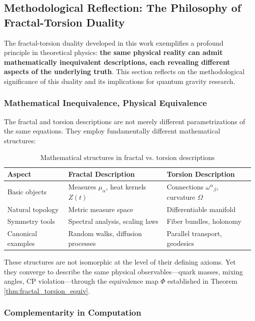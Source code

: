\subsection{Methodological Reflection: The Philosophy of Fractal-Torsion Duality}
\label{sec:methodology}

The fractal-torsion duality developed in this work exemplifies a profound principle in theoretical physics: \textbf{the same physical reality can admit mathematically inequivalent descriptions, each revealing different aspects of the underlying truth}. This section reflects on the methodological significance of this duality and its implications for quantum gravity research.

\subsubsection{Mathematical Inequivalence, Physical Equivalence}

The fractal and torsion descriptions are not merely different parametrizations of the same equations. They employ fundamentally different mathematical structures:

\begin{table}[h]
\centering
\begin{tabular}{p{3cm}p{4cm}p{4cm}}
\hline
\textbf{Aspect} & \textbf{Fractal Description} & \textbf{Torsion Description} \\
\hline
Basic objects & Measures $\mu_\alpha$, heat kernels $Z(t)$ & Connections $\omega^\alpha{}_\beta$, curvature $\Omega$ \\
Natural topology & Metric measure space & Differentiable manifold \\
Symmetry tools & Spectral analysis, scaling laws & Fiber bundles, holonomy \\
Canonical examples & Random walks, diffusion processes & Parallel transport, geodesics \\
\hline
\end{tabular}
\caption{Mathematical structures in fractal vs. torsion descriptions}
\end{table}

These structures are not isomorphic at the level of their defining axioms. Yet they converge to describe the same physical observables—quark masses, mixing angles, CP violation—through the equivalence map $\Phi$ established in Theorem \ref{thm:fractal_torsion_equiv}.

\subsubsection{Complementarity in Computation}


